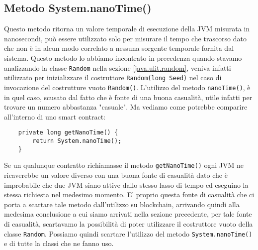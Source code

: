 		\subsection{Metodo System.nanoTime()}
			Questo metodo ritorna un valore temporale di esecuzione della JVM misurata in nanosecondi, può essere utilizzato solo per misurare il tempo che trascorso dato che non è in alcun modo correlato a nessuna sorgente temporale fornita dal sistema. 
			Questo metodo lo abbiamo incontrato in precedenza quando stavamo analizzando la classe \lstinline|Random| nella sezione \ref{java.ulit.random}, veniva infatti utilizzato per inizializzare il costruttore \lstinline|Random(long Seed)| nel caso di invocazione del costrutture vuoto \lstinline|Random()|. L'utilizzo del metodo \lstinline|nanoTime()|, è in quel caso, scusato dal fatto che è fonte di una buona casualità, utile infatti per trovare un numero abbastanza "casuale". Ma vediamo come potrebbe comparire all'interno di uno smart contract:
			\begin{lstlisting}
	private long getNanoTime() {
		return System.nanoTime();
	}
			\end{lstlisting}
			Se un qualunque contratto richiamasse il metodo \lstinline|getNanoTime()| ogni JVM ne ricaverebbe un valore diverso con una buona fonte di casualità dato che è improbabile che due JVM siano attive dallo stesso lasso di tempo ed eseguino la stessa richiesta nel medesimo momento. E' proprio questa fonte di casualità che ci porta a scartare tale metodo dall'utilizzo su blockchain, arrivando quindi alla medesima conclusione a cui siamo arrivati nella sezione precedente, per tale fonte di casualità, scartavamo la possibilità di poter utilizzare il costruttore vuoto della classe \lstinline|Random|. Possiamo quindi scartare l'utilizzo del metodo \lstinline|System.nanoTime()| e di tutte la classi che ne fanno uso.